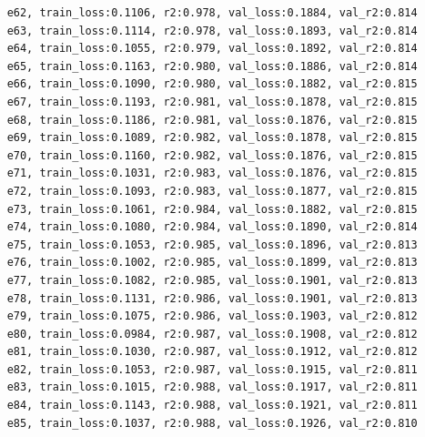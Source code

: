 \documentclass[a4paper, 12pt]{article}
\begin{document}
\begin{lstlisting}
	e62, train_loss:0.1106, r2:0.978, val_loss:0.1884, val_r2:0.814
	e63, train_loss:0.1114, r2:0.978, val_loss:0.1893, val_r2:0.814
	e64, train_loss:0.1055, r2:0.979, val_loss:0.1892, val_r2:0.814
	e65, train_loss:0.1163, r2:0.980, val_loss:0.1886, val_r2:0.814
	e66, train_loss:0.1090, r2:0.980, val_loss:0.1882, val_r2:0.815
	e67, train_loss:0.1193, r2:0.981, val_loss:0.1878, val_r2:0.815
	e68, train_loss:0.1186, r2:0.981, val_loss:0.1876, val_r2:0.815
	e69, train_loss:0.1089, r2:0.982, val_loss:0.1878, val_r2:0.815
	e70, train_loss:0.1160, r2:0.982, val_loss:0.1876, val_r2:0.815
	e71, train_loss:0.1031, r2:0.983, val_loss:0.1876, val_r2:0.815
	e72, train_loss:0.1093, r2:0.983, val_loss:0.1877, val_r2:0.815
	e73, train_loss:0.1061, r2:0.984, val_loss:0.1882, val_r2:0.815
	e74, train_loss:0.1080, r2:0.984, val_loss:0.1890, val_r2:0.814
	e75, train_loss:0.1053, r2:0.985, val_loss:0.1896, val_r2:0.813
	e76, train_loss:0.1002, r2:0.985, val_loss:0.1899, val_r2:0.813
	e77, train_loss:0.1082, r2:0.985, val_loss:0.1901, val_r2:0.813
	e78, train_loss:0.1131, r2:0.986, val_loss:0.1901, val_r2:0.813
	e79, train_loss:0.1075, r2:0.986, val_loss:0.1903, val_r2:0.812
	e80, train_loss:0.0984, r2:0.987, val_loss:0.1908, val_r2:0.812
	e81, train_loss:0.1030, r2:0.987, val_loss:0.1912, val_r2:0.812
	e82, train_loss:0.1053, r2:0.987, val_loss:0.1915, val_r2:0.811
	e83, train_loss:0.1015, r2:0.988, val_loss:0.1917, val_r2:0.811
	e84, train_loss:0.1143, r2:0.988, val_loss:0.1921, val_r2:0.811
	e85, train_loss:0.1037, r2:0.988, val_loss:0.1926, val_r2:0.810
		
		
    \end{lstlisting}	
\end{document}
